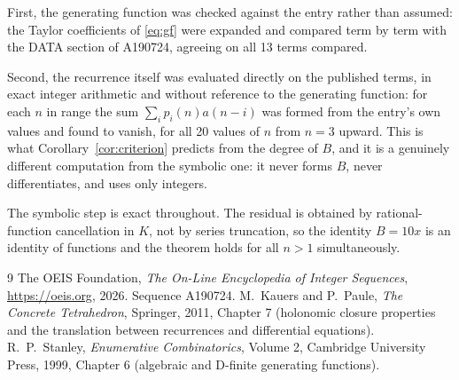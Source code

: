 \documentclass[11pt,a4paper]{article}
\theoremstyle{plain}
\theoremstyle{definition}
\begin{document}
First, the generating function was checked against the entry rather than assumed: the
Taylor coefficients of \eqref{eq:gf} were expanded and compared term by term with the DATA
section of A190724, agreeing on all 13 terms compared.

Second, the recurrence itself was evaluated directly on the published terms, in exact
integer arithmetic and without reference to the generating function: for each $n$ in range
the sum $\sum_{i}p_{i}(n)a(n-i)$ was formed from the entry's own values and found to
vanish, for all 20 values of $n$ from $n=3$ upward. This is what
Corollary~\ref{cor:criterion} predicts from the degree of $B$, and it is a genuinely
different computation from the symbolic one: it never forms $B$, never differentiates, and
uses only integers.

The symbolic step is exact throughout. The residual is obtained by rational-function
cancellation in $K$, not by series truncation, so the identity $B=10 x$ is an
identity of functions and the theorem holds for all $n>1$ simultaneously.

\begin{thebibliography}{9}
 The OEIS Foundation, \emph{The On-Line Encyclopedia of Integer Sequences},
\url{https://oeis.org}, 2026. Sequence A190724.
 M.~Kauers and P.~Paule, \emph{The Concrete Tetrahedron}, Springer, 2011,
Chapter 7 (holonomic closure properties and the translation between recurrences and
differential equations).
 R.~P.~Stanley, \emph{Enumerative Combinatorics}, Volume 2, Cambridge
University Press, 1999, Chapter 6 (algebraic and D-finite generating functions).
\end{thebibliography}
\end{document}
